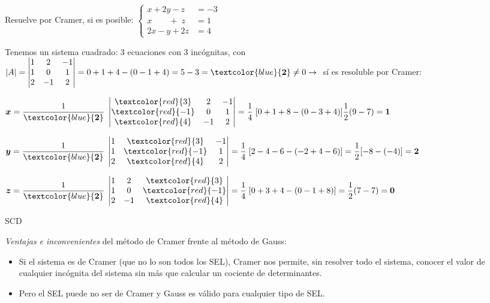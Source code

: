  \begin{ejem}
 Resuelve por Cramer, si es posible: $\begin{cases}
x+2y-z&=-3\\x\quad \quad +\; z&=1\\2x-y+2z&=4	
\end{cases}$

Tenemos un sistema cuadrado: 3 ecuaciones con 3 incógnitas, con $|A|=\left| \begin{matrix} 1&2&-1\\1&0&1\\2&-1&2   \end{matrix} \right| = 0+1+4-(0-1+4)=5-3= \textcolor{blue}{\boldsymbol{2}} \neq 0 \to \;$ sí es resoluble por Cramer:

$\boldsymbol{x}=\dfrac 1 {\textcolor{blue}{\boldsymbol{2}}} \; \left| \begin{matrix} \textcolor{red}{3}&2&-1\\ \textcolor{red}{-1}&0&1\\ \textcolor{red}{4}&-1&2   \end{matrix} \right| = \dfrac 1 4 \; [0+1+8 -(0-3+4 )] \dfrac 1 2 (9-7)=\boldsymbol{1}  $

$\boldsymbol{y}=\dfrac 1 {\textcolor{blue}{\boldsymbol{2}}} \; \left| \begin{matrix} 1&\textcolor{red}{3}&-1\\1&\textcolor{red}{-1}&1\\2&\textcolor{red}{4}&2   \end{matrix} \right| = \dfrac 1 4 \;[2-4-6 -(-2+4-6 )]=\dfrac 1 2 [-8-(-4)]  = \boldsymbol{2} $

$\boldsymbol{z}=\dfrac 1 {\textcolor{blue}{\boldsymbol{2}}} \; \left| \begin{matrix} 1&2&\textcolor{red}{3}\\1&0&\textcolor{red}{-1}\\2&-1&\textcolor{red}{4}   \end{matrix} \right| = \dfrac 1 4 \;[0+3+4 -(0-1+8 )] =\dfrac 1 2 (7-7)  =\boldsymbol{ 0} $

SCD

 \end{ejem}

\emph{Ventajas e inconvenientes} del método de Cramer frente al método de Gauss:

\begin{itemize}
\item Si el sistema es de Cramer (que no lo son todos los SEL), Cramer nos permite, sin resolver todo el sistema, conocer el valor de cualquier incógnita del sistema sin más que calcular un cociente de determinantes.

\item Pero el SEL puede no ser de Cramer y Gauss es válido para cualquier tipo de SEL.
\end{itemize}


